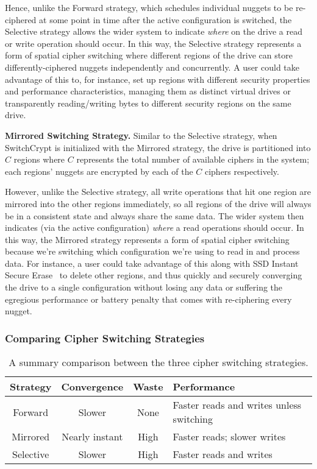 Hence, unlike the Forward strategy, which schedules individual nuggets to be
re-ciphered at some point in time after the active configuration is switched,
the Selective strategy allows the wider system to indicate \emph{where} on the
drive a read or write operation should occur. In this way, the Selective
strategy represents a form of spatial cipher switching where different regions
of the drive can store differently-ciphered nuggets independently and
concurrently. A user could take advantage of this to, for instance, set up
regions with different security properties and performance characteristics,
managing them as distinct virtual drives or transparently reading/writing bytes
to different security regions on the same drive.

\textbf{Mirrored Switching Strategy.} Similar to the Selective strategy, when
SwitchCrypt is initialized with the Mirrored strategy, the drive is partitioned
into $C$ regions where $C$ represents the total number of available ciphers in
the system; each regions' nuggets are encrypted by each of the $C$ ciphers
respectively.

However, unlike the Selective strategy, all write operations that hit one region
are mirrored into the other regions immediately, so all regions of the drive
will always be in a consistent state and always share the same data. The wider
system then indicates (via the active configuration) \emph{where} a read
operations should occur. In this way, the Mirrored strategy represents a form of
spatial cipher switching because we're switching which configuration we're using
to read in and process data. For instance, a user could take advantage of this
along with SSD Instant Secure Erase~\cite{ISE1,ISE2,ISE3} to delete other
regions, and  thus quickly and securely converging the drive to a single configuration
without losing any data or suffering the egregious performance or battery
penalty that comes with re-ciphering every nugget.

\subsubsection{Comparing Cipher Switching Strategies}

\begin{table}[ht]
   \begin{tabular}{@{}|c|c|c|C{25mm}|@{}}
      \toprule
      \textbf{Strategy} & \textbf{Convergence} & \textbf{Waste} &
      \textbf{Performance} \\
      \midrule
      Forward   & Slower       & None & Faster reads and writes unless switching
      \\\hline
      Mirrored  & Nearly instant & High & Faster reads; slower writes \\
      \hline
      Selective & Slower       & High & Faster reads and writes  \\
      \hline
   \end{tabular}
   \caption{A summary comparison between the three cipher switching strategies.}
   \label{tbl:strategies-advantages}
\end{table}

